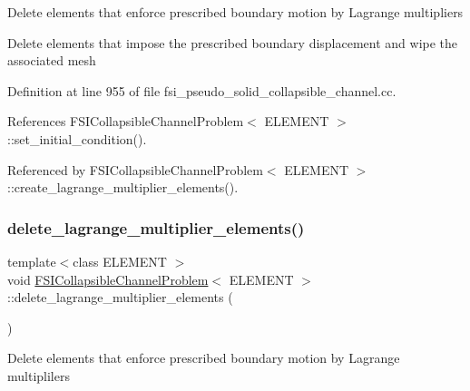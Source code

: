 Delete elements that enforce prescribed boundary motion by Lagrange multipliers

Delete elements that impose the prescribed boundary displacement and wipe the associated mesh 

Definition at line 955 of file fsi\+\_\+pseudo\+\_\+solid\+\_\+collapsible\+\_\+channel.\+cc.



References F\+S\+I\+Collapsible\+Channel\+Problem$<$ E\+L\+E\+M\+E\+N\+T $>$\+::set\+\_\+initial\+\_\+condition().



Referenced by F\+S\+I\+Collapsible\+Channel\+Problem$<$ E\+L\+E\+M\+E\+N\+T $>$\+::create\+\_\+lagrange\+\_\+multiplier\+\_\+elements().

\mbox{\label{classFSICollapsibleChannelProblem_ab853c978c8e94505cd36781569b1dbf1}} 
\subsubsection{\texorpdfstring{delete\+\_\+lagrange\+\_\+multiplier\+\_\+elements()}{delete\_lagrange\_multiplier\_elements()}\hspace{0.1cm}{\footnotesize\ttfamily [2/2]}}
{\footnotesize\ttfamily template$<$class E\+L\+E\+M\+E\+NT $>$ \\
void \hyperlink{classFSICollapsibleChannelProblem}{F\+S\+I\+Collapsible\+Channel\+Problem}$<$ E\+L\+E\+M\+E\+NT $>$\+::delete\+\_\+lagrange\+\_\+multiplier\+\_\+elements (\begin{DoxyParamCaption}{ }\end{DoxyParamCaption})\hspace{0.3cm}{\ttfamily [private]}}

Delete elements that enforce prescribed boundary motion by Lagrange multiplilers \mbox{\label{classFSICollapsibleChannelProblem_af1848415423aa824b91357922905a18f}} 
